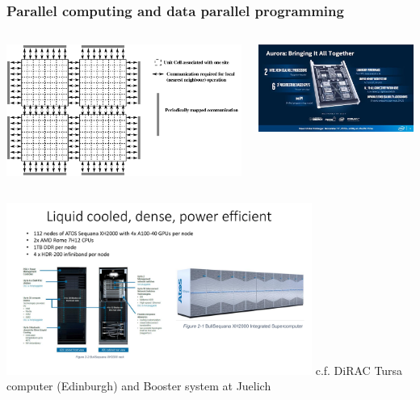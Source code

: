 \documentclass[pdf,ps,8pt]{beamer}
\begin{document}
\begin{frame}[fragile]\small\frametitle{ Parallel computing and data parallel programming}

\begin{columns}
\begin{column}{0.5\textwidth}
  \includegraphics[width=.5\textwidth]{noparitygeom1.pdf}
\end{column}
\begin{column}{0.5\textwidth}
  \includegraphics[width=\textwidth]{Aurora.jpeg}
\end{column}
\end{columns}
\begin{center}
  \includegraphics[width=0.75\textwidth]{TursaSystem.pdf}
  c.f. DiRAC Tursa computer (Edinburgh) and Booster system at Juelich
\end{center}
\end{frame}
\end{document}
